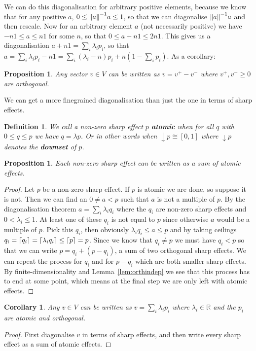 \documentclass[a4paper,onecolumn,10pt,accepted=2019-05-03, issue=1, volume=1, shorttitle=papers/compositionality-1-1]{compositionalityarticle}
\DeclarePairedDelimiter{\ceil}{\lceil}{\rceil}
\newcounter{counter}
\numberwithin{counter}{section}
\newtheorem{proposition}[counter]{Proposition}
\newtheorem{definition}[counter]{Definition}
\newtheorem{corollary}[counter]{Corollary}
\newcommand{\R}{\mathbb{R}}
\begin{document}
We can do this diagonalisation for arbitrary positive elements, because we know that for any positive $a$, $0\leq \norm{a}^{-1}a\leq 1$, so that we can diagonalise $\norm{a}^{-1}a$ and then rescale. Now for an arbitrary element $a$ (not necessarily positive) we have $-n1\leq a \leq n1$ for some $n$, so that $0\leq a+ n1\leq 2n1$. This gives us a diagonalisation $a+n1 = \sum_i\lambda_i p_i$, so that $a = \sum_i\lambda_i p_i - n1 = \sum_i(\lambda_i-n)p_i + n(1-\sum_i p_i)$. As a corollary:
\begin{proposition}
	Any vector $v\in V$ can be written as $v= v^+ - v^-$ where $v^+, v^-\geq 0$ are orthogonal.
\end{proposition}

We can get a more finegrained diagonalisation than just the one in terms of sharp effects.

\begin{definition}
	We call a non-zero sharp effect $p$ \textbf{atomic} when for all $q$ with $0\leq q\leq p$ we have $q=\lambda p$. Or in other words when $\downarrow p \cong [0,1]$ where $\downarrow p$ denotes the \textbf{downset} of $p$.
\end{definition}

\begin{proposition}\label{prop:sharprep}
	Each non-zero sharp effect can be written as a sum of atomic effects.
\end{proposition}
\begin{proof}
	Let $p$ be a non-zero sharp effect. If $p$ is atomic we are done, so suppose it is not. Then we can find an $0\neq a< p$ such that $a$ is not a multiple of $p$. By the diagonalisation theorem $a=\sum_i \lambda_i q_i$ where the $q_i$ are non-zero sharp effects and $0<\lambda_i \leq 1$. At least one of these $q_i$ is not equal to $p$ since otherwise $a$ would be a multiple of $p$. Pick this $q_i$, then obviously $\lambda_i q_i\leq a \leq p$ and by taking ceilings $q_i=\ceil{q_i}=\ceil{\lambda_i q_i}\leq \ceil{p}=p$. Since we know that $q_i\neq p$ we must have $q_i<p$ so that we can write $p=q_i + (p-q_i)$, a sum of two orthogonal sharp effects. We can repeat the process for $q_i$ and for $p-q_i$ which are both smaller sharp effects. By finite-dimensionality and Lemma~\ref{lem:orthindep} we see that this process has to end at some point, which means at the final step we are only left with atomic effects.
\end{proof}

\begin{corollary}\label{cor:atomicspectrum}
    Any $v\in V$ can be written as $v=\sum_i \lambda_i p_i$ where $\lambda_i\in \R$ and the $p_i$ are atomic and orthogonal.
\end{corollary}
\begin{proof}
    First diagonalise $v$ in terms of sharp effects, and then write every sharp effect as a sum of atomic effects.
\end{proof}
\end{document}
